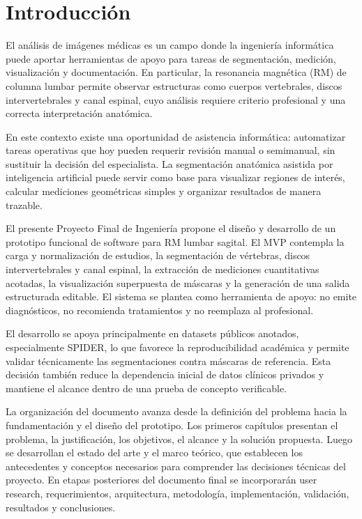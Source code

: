 \chapter{Introducci\'on}

El an\'alisis de im\'agenes m\'edicas es un campo donde la ingenier\'ia inform\'atica puede aportar herramientas de apoyo para tareas de segmentaci\'on, medici\'on, visualizaci\'on y documentaci\'on. En particular, la resonancia magn\'etica (RM) de columna lumbar permite observar estructuras como cuerpos vertebrales, discos intervertebrales y canal espinal, cuyo an\'alisis requiere criterio profesional y una correcta interpretaci\'on anat\'omica.

En este contexto existe una oportunidad de asistencia inform\'atica: automatizar tareas operativas que hoy pueden requerir revisi\'on manual o semimanual, sin sustituir la decisi\'on del especialista. La segmentaci\'on anat\'omica asistida por inteligencia artificial puede servir como base para visualizar regiones de inter\'es, calcular mediciones geom\'etricas simples y organizar resultados de manera trazable.

El presente Proyecto Final de Ingenier\'ia propone el dise\~no y desarrollo de un prototipo funcional de software para RM lumbar sagital. El MVP contempla la carga y normalizaci\'on de estudios, la segmentaci\'on de v\'ertebras, discos intervertebrales y canal espinal, la extracci\'on de mediciones cuantitativas acotadas, la visualizaci\'on superpuesta de m\'ascaras y la generaci\'on de una salida estructurada editable. El sistema se plantea como herramienta de apoyo: no emite diagn\'osticos, no recomienda tratamientos y no reemplaza al profesional.

El desarrollo se apoya principalmente en datasets p\'ublicos anotados, especialmente SPIDER, lo que favorece la reproducibilidad acad\'emica y permite validar t\'ecnicamente las segmentaciones contra m\'ascaras de referencia. Esta decisi\'on tambi\'en reduce la dependencia inicial de datos cl\'inicos privados y mantiene el alcance dentro de una prueba de concepto verificable.

La organizaci\'on del documento avanza desde la definici\'on del problema hacia la fundamentaci\'on y el dise\~no del prototipo. Los primeros cap\'itulos presentan el problema, la justificaci\'on, los objetivos, el alcance y la soluci\'on propuesta. Luego se desarrollan el estado del arte y el marco te\'orico, que establecen los antecedentes y conceptos necesarios para comprender las decisiones t\'ecnicas del proyecto. En etapas posteriores del documento final se incorporar\'an user research, requerimientos, arquitectura, metodolog\'ia, implementaci\'on, validaci\'on, resultados y conclusiones.
